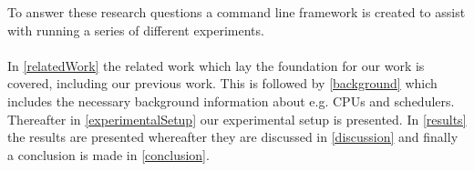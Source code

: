 
To answer these research questions a command line framework is created to assist with running a series of different experiments.

\paragraph{}
In \cref{relatedWork} the related work which lay the foundation for our work is covered, including our previous work. This is followed by \cref{background} which includes the necessary background information about e.g. CPUs and schedulers. Thereafter in \cref{experimentalSetup} our experimental setup is presented. %
In \cref{results} the results are presented whereafter they are discussed in \cref{discussion} and finally a conclusion is made in \cref{conclusion}. 

